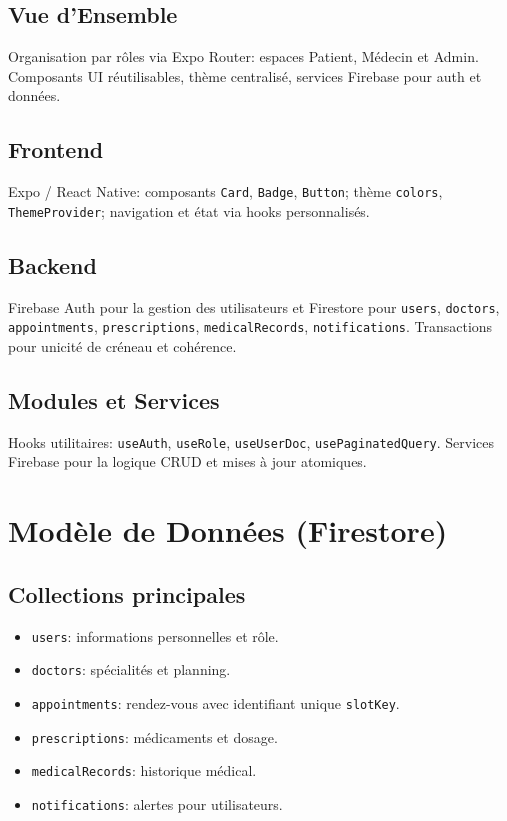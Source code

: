 \documentclass[12pt,a4paper]{report}
\begin{document}
\section{Vue d’Ensemble}
Organisation par rôles via Expo Router: espaces Patient, Médecin et Admin. Composants UI réutilisables, thème centralisé, services Firebase pour auth et données.
\section{Frontend}
Expo / React Native: composants \texttt{Card}, \texttt{Badge}, \texttt{Button}; thème \texttt{colors}, \texttt{ThemeProvider}; navigation et état via hooks personnalisés.
\section{Backend}
Firebase Auth pour la gestion des utilisateurs et Firestore pour \texttt{users}, \texttt{doctors}, \texttt{appointments}, \texttt{prescriptions}, \texttt{medicalRecords}, \texttt{notifications}. Transactions pour unicité de créneau et cohérence.
\section{Modules et Services}
Hooks utilitaires: \texttt{useAuth}, \texttt{useRole}, \texttt{useUserDoc}, \texttt{usePaginatedQuery}. Services Firebase pour la logique CRUD et mises à jour atomiques.
\chapter{Modèle de Données (Firestore)}
\section{Collections principales}
\begin{itemize}
\item \texttt{users}: informations personnelles et rôle.
\item \texttt{doctors}: spécialités et planning.
\item \texttt{appointments}: rendez-vous avec identifiant unique \texttt{slotKey}.
\item \texttt{prescriptions}: médicaments et dosage.
\item \texttt{medicalRecords}: historique médical.
\item \texttt{notifications}: alertes pour utilisateurs.
\end{itemize}
\end{document}
